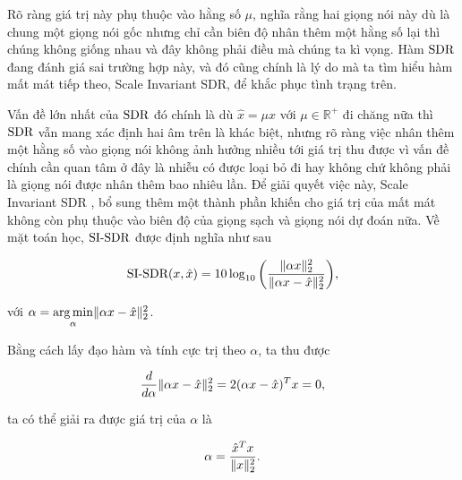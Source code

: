 				Rõ ràng giá trị này phụ thuộc vào hằng số $\mu$, nghĩa rằng hai giọng nói này dù là chung một giọng nói gốc nhưng chỉ cần biên độ nhân thêm một hằng số lại thì chúng không giống nhau và đây không phải điều mà chúng ta kì vọng. Hàm $\text{SDR}$ đang đánh giá sai trường hợp này, và đó cũng chính là lý do mà ta tìm hiểu hàm mất mát tiếp theo, Scale Invariant SDR, để khắc phục tình trạng trên.
		
			 Vấn đề lớn nhất của $\text{SDR}$ đó chính là dù $\hat{x} = \mu x$ với $\mu \in \mathbb{R}^+$ đi chăng nữa thì $\text{SDR}$ vẫn mang xác định hai âm trên là khác biệt, nhưng rõ ràng việc nhân thêm một hằng số vào giọng nói không ảnh hưởng nhiều tới giá trị thu được vì vấn đề chính cần quan tâm ở đây là nhiễu có được loại bỏ đi hay không chứ không phải là giọng nói được nhân thêm bao nhiêu lần. Để giải quyết việc này, Scale Invariant SDR \cite{sisdr}, bổ sung thêm một thành phần khiến cho giá trị của mất mát không còn phụ thuộc vào biên độ của giọng sạch và giọng nói dự đoán nữa. Về mặt toán học, $\text{SI-SDR}$ được định nghĩa như sau
				
					\begin{equation}
						\text{SI-SDR}(x, \hat{x}) = 10\log_{10} \bigg (\frac{\lVert \alpha x \rVert^2_2}{\lVert \alpha x - \hat{x} \rVert^2_2} \bigg ),
						\label{rl::si_sdr_formula}
					\end{equation}
				
				\noindent với $\alpha = \underset{\alpha}{\operatorname*{arg\,min}} \lVert \alpha x - \hat{x} \rVert^2_2$. 
				
				Bằng cách lấy đạo hàm và tính cực trị theo $\alpha$, ta thu được
				
					\begin{equation}
						\frac{d}{d\alpha} \lVert \alpha x - \hat{x} \rVert^2_2 = 2 (\alpha x - \hat{x})^T x = 0,
					\end{equation}
					
				\noindent ta có thể giải ra được giá trị của $\alpha$ là
				
					\begin{equation}
						\alpha = \frac{\hat{x}^T x}{\lVert x \rVert^2_2}.
					\end{equation}
					
				
				
